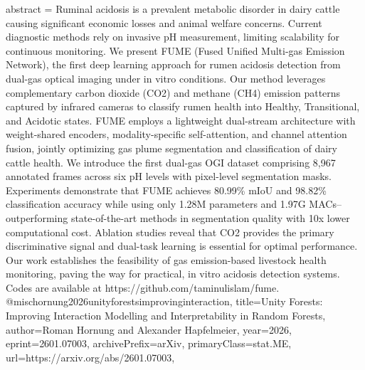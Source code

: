 {      abstract = {Ruminal acidosis is a prevalent metabolic disorder in dairy cattle causing significant economic losses and animal welfare concerns. Current diagnostic methods rely on invasive pH measurement, limiting scalability for continuous monitoring. We present FUME (Fused Unified Multi-gas Emission Network), the first deep learning approach for rumen acidosis detection from dual-gas optical imaging under in vitro conditions. Our method leverages complementary carbon dioxide (CO2) and methane (CH4) emission patterns captured by infrared cameras to classify rumen health into Healthy, Transitional, and Acidotic states. FUME employs a lightweight dual-stream architecture with weight-shared encoders, modality-specific self-attention, and channel attention fusion, jointly optimizing gas plume segmentation and classification of dairy cattle health. We introduce the first dual-gas OGI dataset comprising 8,967 annotated frames across six pH levels with pixel-level segmentation masks. Experiments demonstrate that FUME achieves 80.99\% mIoU and 98.82\% classification accuracy while using only 1.28M parameters and 1.97G MACs--outperforming state-of-the-art methods in segmentation quality with 10x lower computational cost. Ablation studies reveal that CO2 provides the primary discriminative signal and dual-task learning is essential for optimal performance. Our work establishes the feasibility of gas emission-based livestock health monitoring, paving the way for practical, in vitro acidosis detection systems. Codes are available at https://github.com/taminulislam/fume.}
}@misc{hornung2026unityforestsimprovinginteraction,
      title={Unity Forests: Improving Interaction Modelling and Interpretability in Random Forests}, 
      author={Roman Hornung and Alexander Hapfelmeier},
      year={2026},
      eprint={2601.07003},
      archivePrefix={arXiv},
      primaryClass={stat.ME},
      url={https://arxiv.org/abs/2601.07003},
}
